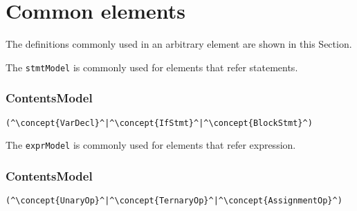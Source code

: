 \section{Common elements}
The definitions commonly used in an arbitrary element are shown in this Section.

The {\tt stmtModel} is commonly used for elements that refer statements.

\subsubsection*{ContentsModel}{}

\begin{lstlisting}[style=default,frame=none]
(^\concept{VarDecl}^|^\concept{IfStmt}^|^\concept{BlockStmt}^)
\end{lstlisting}


The {\tt exprModel} is commonly used for elements that refer expression.

\subsubsection*{ContentsModel}{}

\begin{lstlisting}[style=default,frame=none]
(^\concept{UnaryOp}^|^\concept{TernaryOp}^|^\concept{AssignmentOp}^)
\end{lstlisting}
